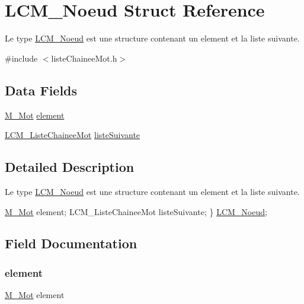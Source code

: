 \hypertarget{struct_l_c_m___noeud}{}\section{L\+C\+M\+\_\+\+Noeud Struct Reference}
\label{struct_l_c_m___noeud}


Le type \hyperlink{struct_l_c_m___noeud}{L\+C\+M\+\_\+\+Noeud} est une structure contenant un element et la liste suivante.  




{\ttfamily \#include $<$liste\+Chainee\+Mot.\+h$>$}

\subsection*{Data Fields}
\begin{DoxyCompactItemize}
\item 
\hyperlink{struct_m___mot}{M\+\_\+\+Mot} \hyperlink{struct_l_c_m___noeud_ad70bdb775ed4b98796c68cc993aeeb4f}{element}
\item 
\hyperlink{liste_chainee_mot_8h_ad50c59d1ac1fa184aba663121d8e4087}{L\+C\+M\+\_\+\+Liste\+Chainee\+Mot} \hyperlink{struct_l_c_m___noeud_a422b2aadd62b7996fbd4a00da43e47ab}{liste\+Suivante}
\end{DoxyCompactItemize}


\subsection{Detailed Description}
Le type \hyperlink{struct_l_c_m___noeud}{L\+C\+M\+\_\+\+Noeud} est une structure contenant un element et la liste suivante. 

\hyperlink{struct_m___mot}{M\+\_\+\+Mot} element; L\+C\+M\+\_\+\+Liste\+Chainee\+Mot liste\+Suivante; \} \hyperlink{struct_l_c_m___noeud}{L\+C\+M\+\_\+\+Noeud}; 

\subsection{Field Documentation}
\mbox{\label{struct_l_c_m___noeud_ad70bdb775ed4b98796c68cc993aeeb4f}} 
\subsubsection{\texorpdfstring{element}{element}}
{\footnotesize\ttfamily \hyperlink{struct_m___mot}{M\+\_\+\+Mot} element}


